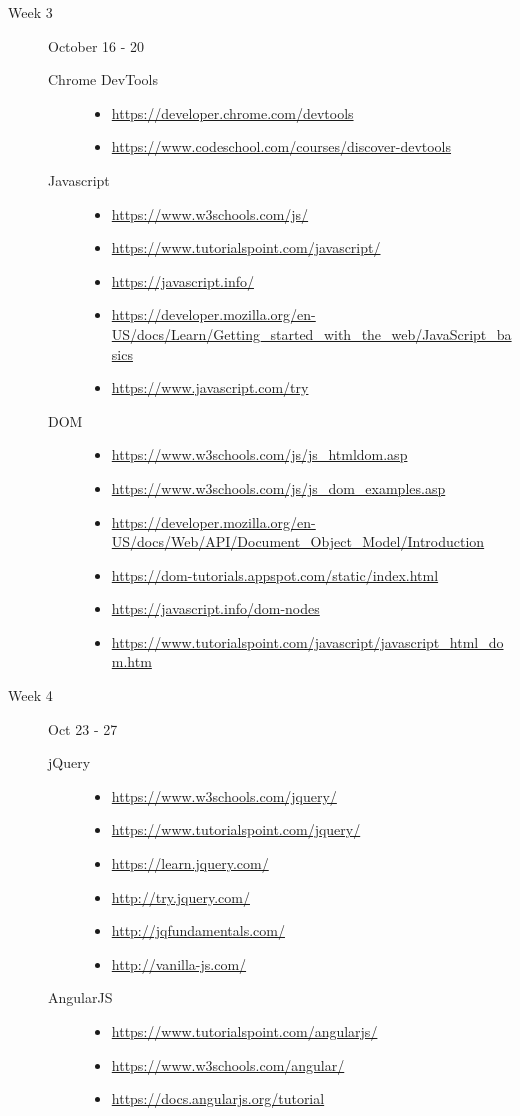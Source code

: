 \documentclass{article}
\newcommand{\myitem}[1]{\item{\scriptsize\url{#1}}}
\begin{document}
\begin{description}
\item[Week 3] October 16 - 20
  \begin{description}
\item[Chrome DevTools]\mbox{}
  \begin{itemize}
  \myitem{https://developer.chrome.com/devtools}
  \myitem{https://www.codeschool.com/courses/discover-devtools}
  \end{itemize}

\item[Javascript]\mbox{}
  \begin{itemize}
  \myitem{https://www.w3schools.com/js/}
  \myitem{https://www.tutorialspoint.com/javascript/}
  \myitem{https://javascript.info/}
  \myitem{https://developer.mozilla.org/en-US/docs/Learn/Getting_started_with_the_web/JavaScript_basics}
  \myitem{https://www.javascript.com/try}
  \end{itemize}

\item[DOM]\mbox{}
  \begin{itemize}
  \myitem{https://www.w3schools.com/js/js_htmldom.asp}
  \myitem{https://www.w3schools.com/js/js_dom_examples.asp}
  \myitem{https://developer.mozilla.org/en-US/docs/Web/API/Document_Object_Model/Introduction}
  \myitem{https://dom-tutorials.appspot.com/static/index.html}
  \myitem{https://javascript.info/dom-nodes}
  \myitem{https://www.tutorialspoint.com/javascript/javascript_html_dom.htm}
  \end{itemize}


  \end{description}
  \item[Week 4] Oct 23 - 27
\begin{description}


\item[jQuery]\mbox{}
  \begin{itemize}
  \myitem{https://www.w3schools.com/jquery/}
  \myitem{https://www.tutorialspoint.com/jquery/}
  \myitem{https://learn.jquery.com/}
  \myitem{http://try.jquery.com/}
  \myitem{http://jqfundamentals.com/}
  \myitem{http://vanilla-js.com/}

  \end{itemize}

  
\item[AngularJS]\mbox{}
  \begin{itemize}
    \myitem{https://www.tutorialspoint.com/angularjs/}
    \myitem{https://www.w3schools.com/angular/}
    \myitem{https://docs.angularjs.org/tutorial}
  \end{itemize}
  



\end{description}
\end{description}
\end{document}

